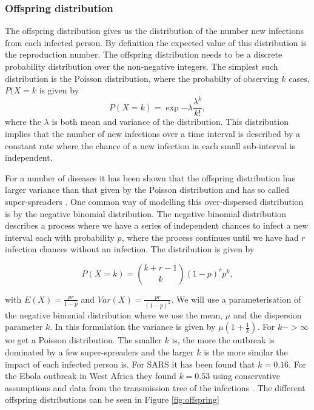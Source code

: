 \documentclass[12pt]{article}
\begin{document}
\subsubsection{Offspring distribution}
The offspring distribution gives us the distribution of the number new infections from each infected person. By definition the expected value of this distribution is the reproduction number. The offspring distribution needs to be a discrete probability distribution over the non-negative integers. The simplest such distribution is the Poisson distribution, where the probabilty of observing $k$ cases, $P(X=k$ is given by
\[P(X=k) = \exp{-\lambda}\frac{\lambda^k}{k!}, \]
where the $\lambda$ is both  mean and variance of the distribution. This distribution implies that the number of new infections over a time interval is described by a constant rate where the chance of a new infection in each small sub-interval is independent.

For a number of diseases it has been shown that the offspring distribution has larger variance than that given by the Poisson distribution and has so called super-spreaders \cite{lloyd-smithSuperspreadingEffectIndividual2005}. One common way of modelling this over-dispersed distribution is by the negative binomial distribution. The negative binomial distribution describes a process where we have a series of independent chances to infect a new interval each with probability $p$, where the process continues until we have had $r$ infection chances without an infection. The distribution is given by

\[P(X=k) = {k + r - 1 \choose k} (1-p)^rp^k, \]

with $E(X)=\frac{pr}{1-p}$ and $Var(X) = \frac{pr}{(1-p)^2}$. We will use a parameterisation of the negative binomial distribution where we use the mean, $\mu$ and the dispersion parameter $k$. In this formulation the variance is given by $\mu(1 + \frac{1}{k})$. For $k->\infty$ we get a Poisson distribution. The smaller $k$ is, the more the outbreak is dominated by a few super-spreaders and the larger $k$ is the more similar the impact of each infected person is. For SARS it has been found that $k=0.16$\cite{lloyd-smithSuperspreadingEffectIndividual2005}. For the Ebola outbreak in West Africa they found $k=0.53$ using conservative assumptions and data from the transmission tree of the infections \cite{internationalebolaresponseteamExposurePatternsDriving2016}. The different offspring distributions can be seen in Figure \ref{fig:offspring}
\end{document}
